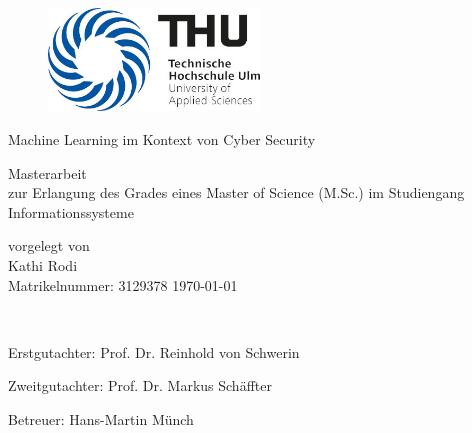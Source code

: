 \documentclass[
    12pt, %
    DIV10,
    ngerman, %
    a4paper, %
    oneside, %
    titlepage, %
    parskip=half, %
    headings=normal, %
    listof=totoc, %
    bibliography=totoc, %
    index=totoc, %
    captions=tableheading, %
    final %
]{scrreprt}
\def\frontmatter{%
    \pagenumbering{roman}
    \setcounter{page}{1}
    \renewcommand{\thesection}{\Roman{section}}
}%
\begin{document}
\frontmatter 

\begin{titlepage} 
	\newcommand{\HRule}{\rule{\linewidth}{1.5mm}} 
	\center
	\begin{figure}
	\centering
	\includegraphics[width=0.5\textwidth]{img/logo}
	\label{pic:Logo}
	\end{figure}
	
	 
	
	\begin{center}
	\end{center}

		{\huge Machine Learning im Kontext von Cyber Security}\\[0.4cm]
\begin{center}
\end{center}
		{\Large Masterarbeit}\\ 
		{zur Erlangung des Grades eines Master of Science (M.Sc.) im Studiengang Informationssysteme}
\vfill
\begin{center}
		{vorgelegt von}\ \\
\vspace{0.25\baselineskip}
		{\Large Kathi Rodi}\ \\
\vfill
\vspace{0.25\baselineskip}
		{\Large Matrikelnummer: 3129378}
		\vfill			
{\Large \today} 
\end{center}	
\\[\baselineskip]
\vfill	
\begin{center}
{\large Erstgutachter: Prof. Dr. Reinhold von Schwerin}\\	
\end{center}
\begin{center}
{\large Zweitgutachter: Prof. Dr. Markus Schäffter}
\end{center}
\begin{center}
{\large Betreuer: Hans-Martin Münch}
\end{center}
	
\end{titlepage}
\end{document}
